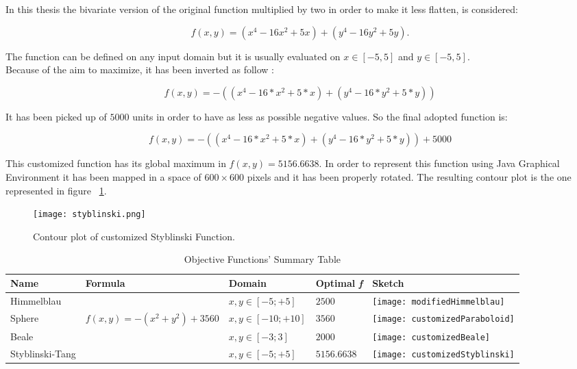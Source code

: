 In this thesis the bivariate version of the original function multiplied by two in order to make it less flatten, is considered:

\begin{equation}
f(x, y) = (x^4 - 16x^2 + 5x) + (y^4 - 16y^2 + 5y).
\end{equation}

The function can be defined on any input domain but it is usually evaluated on $x \in [-5, 5]$ and $y \in [-5, 5]$. \\

Because of the aim to maximize, it has been inverted as follow :

\begin{equation}
f(x, y) = -((x^4 - 16 * x^2 + 5 * x) + (y^4 - 16 * y^2 + 5 * y))
\end{equation}

It has been picked up of $5000$ units in order to have as less as possible negative values. So the final adopted function is: 

\begin{equation}
f(x, y) = -((x^4 - 16 * x^2 + 5 * x) + (y^4 - 16 * y^2 + 5 * y)) + 5000
\end{equation}

This customized function has its global maximum in $f(x, y) = 5156.6638$. In order to represent this function using Java Graphical Environment it has been mapped in a space of $600 \times 600$ pixels and it has been properly rotated. The resulting contour plot is the one represented in figure ~\ref{fig:ContourStyblinskiFunction}.

\begin{figure}[h!]
	\centering
	\texttt{[image: styblinski.png]}
	\caption{Contour plot of customized Styblinski Function.}
	\label{fig:ContourStyblinskiFunction}
\end{figure}

\begin{table} 
	\centering
	\caption{Objective Functions'  Summary Table}
	\begin{tabular}
		{l l l l l} \hline Name & Formula & Domain & Optimal \textit{f} & Sketch \\
		\hline Himmelblau & \vtop{\hbox{\strut $f(x, y) = - ((x^2 + y -11)^2+$}\hbox{\strut $+(x + y^2 - 7)^2) + 2500$}} & $x, y \in [-5;+5]$ & $2500$ & \parbox[c]{1em}{
			\texttt{[image: modifiedHimmelblau]}} \\
		Sphere & $f(x, y) = -(x^2 + y^2) + 3560$ &$x, y \in [-10;+10]$ & $3560$ & \parbox[c]{1em}{
			\texttt{[image: customizedParaboloid]}} \\
		Beale &  &$x, y \in [-3;3]$ & $2000$ & \parbox[c]{1em}{
			\texttt{[image: customizedBeale]}} \\
		Styblinski-Tang &  &$x, y \in [-5;+5]$ & $5156.6638$ & \parbox[c]{1em}{
			\texttt{[image: customizedStyblinski]}} \\
		\hline
	\end{tabular}
\end{table}

